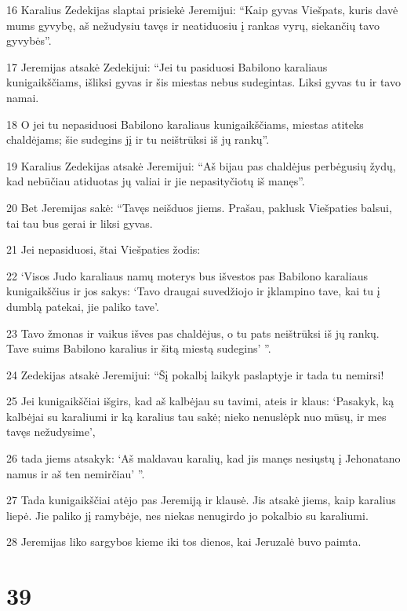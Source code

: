 \par 16 Karalius Zedekijas slaptai prisiekė Jeremijui: “Kaip gyvas Viešpats, kuris davė mums gyvybę, aš nežudysiu tavęs ir neatiduosiu į rankas vyrų, siekančių tavo gyvybės”. 
\par 17 Jeremijas atsakė Zedekijui: “Jei tu pasiduosi Babilono karaliaus kunigaikščiams, išliksi gyvas ir šis miestas nebus sudegintas. Liksi gyvas tu ir tavo namai. 
\par 18 O jei tu nepasiduosi Babilono karaliaus kunigaikščiams, miestas atiteks chaldėjams; šie sudegins jį ir tu neištrūksi iš jų rankų”. 
\par 19 Karalius Zedekijas atsakė Jeremijui: “Aš bijau pas chaldėjus perbėgusių žydų, kad nebūčiau atiduotas jų valiai ir jie nepasityčiotų iš manęs”. 
\par 20 Bet Jeremijas sakė: “Tavęs neišduos jiems. Prašau, paklusk Viešpaties balsui, tai tau bus gerai ir liksi gyvas. 
\par 21 Jei nepasiduosi, štai Viešpaties žodis: 
\par 22 ‘Visos Judo karaliaus namų moterys bus išvestos pas Babilono karaliaus kunigaikščius ir jos sakys: ‘Tavo draugai suvedžiojo ir įklampino tave, kai tu į dumblą patekai, jie paliko tave’. 
\par 23 Tavo žmonas ir vaikus išves pas chaldėjus, o tu pats neištrūksi iš jų rankų. Tave suims Babilono karalius ir šitą miestą sudegins’ ”. 
\par 24 Zedekijas atsakė Jeremijui: “Šį pokalbį laikyk paslaptyje ir tada tu nemirsi! 
\par 25 Jei kunigaikščiai išgirs, kad aš kalbėjau su tavimi, ateis ir klaus: ‘Pasakyk, ką kalbėjai su karaliumi ir ką karalius tau sakė; nieko nenuslėpk nuo mūsų, ir mes tavęs nežudysime’, 
\par 26 tada jiems atsakyk: ‘Aš maldavau karalių, kad jis manęs nesiųstų į Jehonatano namus ir aš ten nemirčiau’ ”. 
\par 27 Tada kunigaikščiai atėjo pas Jeremiją ir klausė. Jis atsakė jiems, kaip karalius liepė. Jie paliko jį ramybėje, nes niekas nenugirdo jo pokalbio su karaliumi. 
\par 28 Jeremijas liko sargybos kieme iki tos dienos, kai Jeruzalė buvo paimta.



\chapter{39}


